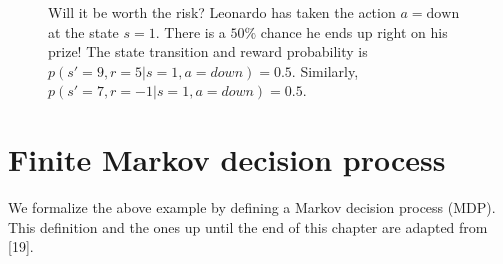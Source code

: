 \documentclass[
  letterpaper,
]{report}
\theoremstyle{definition}
\theoremstyle{plain}
\theoremstyle{definition}
\theoremstyle{remark}
\begin{document}
\begin{figure}


\caption{\label{fig-gridworld\_teleporter}Will it be worth the risk?
Leonardo has taken the action \(a = \text{down}\) at the state \(s=1\).
There is a \(50\%\) chance he ends up right on his prize! The state
transition and reward probability is \(p(s'=9,r=5|s=1,a=down) = 0.5\).
Similarly, \(p(s'=7,r=-1|s=1,a=down) = 0.5\).}

\end{figure}%

\section{Finite Markov decision
process}\label{finite-markov-decision-process}

We formalize the above example by defining a Markov decision process
(MDP). This definition and the ones up until the end of this chapter are
adapted from {[}19{]}.
\end{document}
